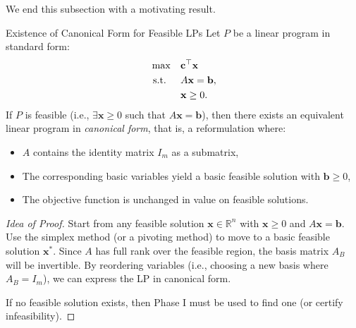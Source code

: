 We end this subsection with a motivating result.

\begin{proposition}{Existence of Canonical Form for Feasible LPs}\label{prop:canonical-exists}
Let \( P \) be a linear program in standard form:
\[
\begin{aligned}
\max \quad & \mathbf{c}^\top \mathbf{x} \\
\text{ s.t. } \quad & A\mathbf{x} = \mathbf{b}, \\
& \mathbf{x} \geq 0.
\end{aligned}
\]
If \( P \) is feasible (i.e., \( \exists \mathbf{x} \geq 0 \) such that \( A\mathbf{x} = \mathbf{b} \)), then there exists an equivalent linear program in \emph{canonical form}, that is, a reformulation where:
\begin{itemize}
    \item \( A \) contains the identity matrix \( I_m \) as a submatrix,
    \item The corresponding basic variables yield a basic feasible solution with \( \mathbf{b} \geq 0 \),
    \item The objective function is unchanged in value on feasible solutions.
\end{itemize}
\end{proposition}

\begin{proof}[Idea of Proof]
Start from any feasible solution \( \mathbf{x} \in \mathbb{R}^n \) with \( \mathbf{x} \geq 0 \) and \( A\mathbf{x} = \mathbf{b} \).  
Use the simplex method (or a pivoting method) to move to a basic feasible solution \( \mathbf{x}^* \).  
Since \( A \) has full rank over the feasible region, the basis matrix \( A_B \) will be invertible.  
By reordering variables (i.e., choosing a new basis where \( A_B = I_m \)), we can express the LP in canonical form.

If no feasible solution exists, then Phase I must be used to find one (or certify infeasibility).
\end{proof}

